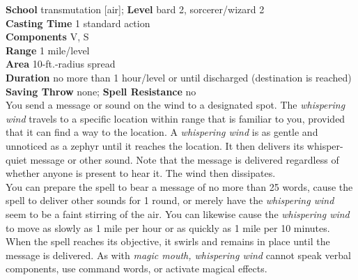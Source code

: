 \textbf{School} transmutation [air]; \textbf{Level} bard 2, sorcerer/wizard 2\\
\textbf{Casting Time} 1 standard action\\
\textbf{Components} V, S\\
\textbf{Range} 1 mile/level\\
\textbf{Area} 10-ft.-radius spread\\
\textbf{Duration} no more than 1 hour/level or until discharged (destination is reached)\\
\textbf{Saving Throw} none; \textbf{Spell Resistance} no\\
You send a message or sound on the wind to a designated spot. The \textit{whispering wind }travels to a specific location within range that is familiar to you, provided that it can find a way to the location. A \textit{whispering wind }is as gentle and unnoticed as a zephyr until it reaches the location. It then delivers its whisper-quiet message or other sound. Note that the message is delivered regardless of whether anyone is present to hear it. The wind then dissipates.\\
You can prepare the spell to bear a message of no more than 25 words, cause the spell to deliver other sounds for 1 round, or merely have the \textit{whispering wind }seem to be a faint stirring of the air. You can likewise cause the \textit{whispering wind }to move as slowly as 1 mile per hour or as quickly as 1 mile per 10 minutes.\\
When the spell reaches its objective, it swirls and remains in place until the message is delivered. As with \textit{magic mouth, whispering wind }cannot speak verbal components, use command words, or activate magical effects.\\
